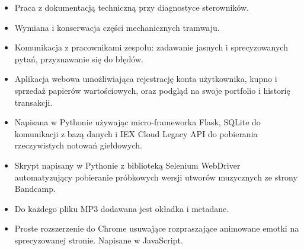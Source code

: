 \documentclass[10pt,a4paper]{altacv}
\begin{document}


\begin{itemize}
\item Praca z dokumentacją techniczną przy diagnostyce sterowników.
\item Wymiana i konserwacja części mechanicznych tramwaju.
\item Komunikacja z pracownikami zespołu: zadawanie jasnych i sprecyzowanych pytań, przyznawanie się do błędów.
\end{itemize}




\begin{itemize}
\item Aplikacja webowa umożliwiająca rejestrację konta użytkownika, kupno i sprzedaż papierów wartościowych, oraz podgląd na swoje portfolio i historię transakcji.
\item Napisana w Pythonie używając micro-frameworka Flask, SQLite do komunikacji z bazą danych i IEX Cloud Legacy API do pobierania rzeczywistych notowań giełdowych.

\end{itemize}
\medskip
\divider

\begin{itemize}
    \item Skrypt napisany w Pythonie z biblioteką Selenium WebDriver automatyzujący pobieranie próbkowych wersji utworów muzycznych ze strony Bandcamp.
    \item Do każdego pliku MP3 dodawana jest okładka i metadane.
\end{itemize}
\divider
\medskip

\begin{itemize}
    \item Proste rozszerzenie do Chrome usuwające rozpraszające animowane emotki na sprecyzowanej stronie. Napisane w JavaScript.
\end{itemize}



\clearpage




\end{document}
